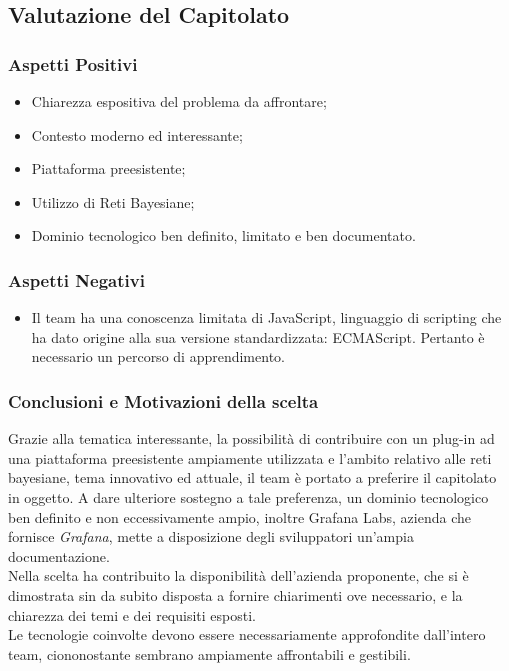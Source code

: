 \subsection{Valutazione del Capitolato}
\subsubsection{Aspetti Positivi}
\begin{itemize}
	\item Chiarezza espositiva del problema da affrontare;
	\item Contesto moderno ed interessante;
	\item Piattaforma preesistente;
	\item Utilizzo di Reti Bayesiane;
	\item Dominio tecnologico ben definito, limitato e ben documentato.
\end{itemize}

\subsubsection{Aspetti Negativi}
\begin{itemize}
	\item Il team ha una conoscenza limitata di JavaScript\glossario, linguaggio di scripting che ha dato origine alla sua versione standardizzata: ECMAScript. Pertanto è necessario un percorso di apprendimento.
\end{itemize}

\subsubsection{Conclusioni e Motivazioni della scelta}
Grazie alla tematica interessante, la possibilità di contribuire con un plug-in ad una piattaforma preesistente ampiamente utilizzata e l'ambito relativo alle reti bayesiane, tema innovativo ed attuale, il team è portato a preferire il capitolato in oggetto. A dare ulteriore sostegno a tale preferenza, un dominio tecnologico ben definito e non eccessivamente ampio, inoltre {Grafana Labs}, azienda che fornisce \textit{Grafana}, mette a disposizione degli sviluppatori un'ampia documentazione.\\
 Nella scelta ha contribuito la disponibilità dell'azienda proponente, che si è dimostrata sin da subito disposta a fornire chiarimenti ove necessario, e la chiarezza dei temi e dei requisiti esposti.\\
Le tecnologie coinvolte devono essere necessariamente approfondite dall'intero team, ciononostante sembrano  ampiamente affrontabili e gestibili.

